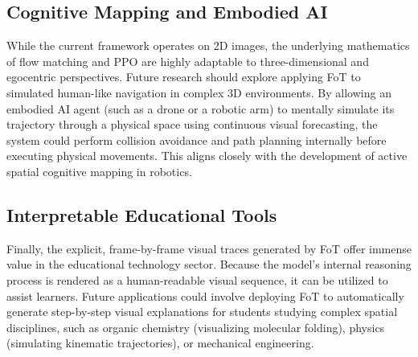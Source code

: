 \documentclass{l4proj}
\begin{document}
\subsection{Cognitive Mapping and Embodied AI}
While the current framework operates on 2D images, the underlying mathematics of flow matching and PPO are highly adaptable to three-dimensional and egocentric perspectives. Future research should explore applying FoT to simulated human-like navigation in complex 3D environments. By allowing an embodied AI agent (such as a drone or a robotic arm) to mentally simulate its trajectory through a physical space using continuous visual forecasting, the system could perform collision avoidance and path planning internally before executing physical movements. This aligns closely with the development of active spatial cognitive mapping in robotics.

\subsection{Interpretable Educational Tools}
Finally, the explicit, frame-by-frame visual traces generated by FoT offer immense value in the educational technology sector. Because the model's internal reasoning process is rendered as a human-readable visual sequence, it can be utilized to assist learners. Future applications could involve deploying FoT to automatically generate step-by-step visual explanations for students studying complex spatial disciplines, such as organic chemistry (visualizing molecular folding), physics (simulating kinematic trajectories), or mechanical engineering.



\renewcommand{\thechapter}{0}

\end{document}
